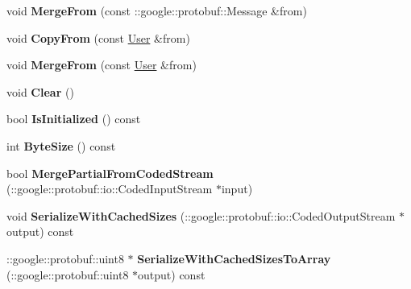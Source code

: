 \begin{DoxyCompactItemize}
\item 
\hypertarget{classSimpleChat_1_1User_aa98a5a27bfcb62c16a9481ad250b04e1}{void {\bfseries Merge\-From} (const \-::google\-::protobuf\-::\-Message \&from)}\label{classSimpleChat_1_1User_aa98a5a27bfcb62c16a9481ad250b04e1}

\item 
\hypertarget{classSimpleChat_1_1User_a0a68a82ad5773b1159f589ee7818473a}{void {\bfseries Copy\-From} (const \hyperlink{classSimpleChat_1_1User}{User} \&from)}\label{classSimpleChat_1_1User_a0a68a82ad5773b1159f589ee7818473a}

\item 
\hypertarget{classSimpleChat_1_1User_a4e808fbb7de9a513a82f4953f4570dab}{void {\bfseries Merge\-From} (const \hyperlink{classSimpleChat_1_1User}{User} \&from)}\label{classSimpleChat_1_1User_a4e808fbb7de9a513a82f4953f4570dab}

\item 
\hypertarget{classSimpleChat_1_1User_a9f4642144eddd10efeea8ebaff51ca65}{void {\bfseries Clear} ()}\label{classSimpleChat_1_1User_a9f4642144eddd10efeea8ebaff51ca65}

\item 
\hypertarget{classSimpleChat_1_1User_a8297129a543c5ca7b463c4ba4c068894}{bool {\bfseries Is\-Initialized} () const }\label{classSimpleChat_1_1User_a8297129a543c5ca7b463c4ba4c068894}

\item 
\hypertarget{classSimpleChat_1_1User_a43b778242ccd21d5d75bd4dc081be929}{int {\bfseries Byte\-Size} () const }\label{classSimpleChat_1_1User_a43b778242ccd21d5d75bd4dc081be929}

\item 
\hypertarget{classSimpleChat_1_1User_a4059958ebf9d50ce6acc096d61ff77b7}{bool {\bfseries Merge\-Partial\-From\-Coded\-Stream} (\-::google\-::protobuf\-::io\-::\-Coded\-Input\-Stream $\ast$input)}\label{classSimpleChat_1_1User_a4059958ebf9d50ce6acc096d61ff77b7}

\item 
\hypertarget{classSimpleChat_1_1User_af2d83f1ae710a5641e6cc163c81c0a3e}{void {\bfseries Serialize\-With\-Cached\-Sizes} (\-::google\-::protobuf\-::io\-::\-Coded\-Output\-Stream $\ast$output) const }\label{classSimpleChat_1_1User_af2d83f1ae710a5641e6cc163c81c0a3e}

\item 
\hypertarget{classSimpleChat_1_1User_a3cc508253897c0ea00a617065d24b9a4}{\-::google\-::protobuf\-::uint8 $\ast$ {\bfseries Serialize\-With\-Cached\-Sizes\-To\-Array} (\-::google\-::protobuf\-::uint8 $\ast$output) const }\label{classSimpleChat_1_1User_a3cc508253897c0ea00a617065d24b9a4}


\end{DoxyCompactItemize}
